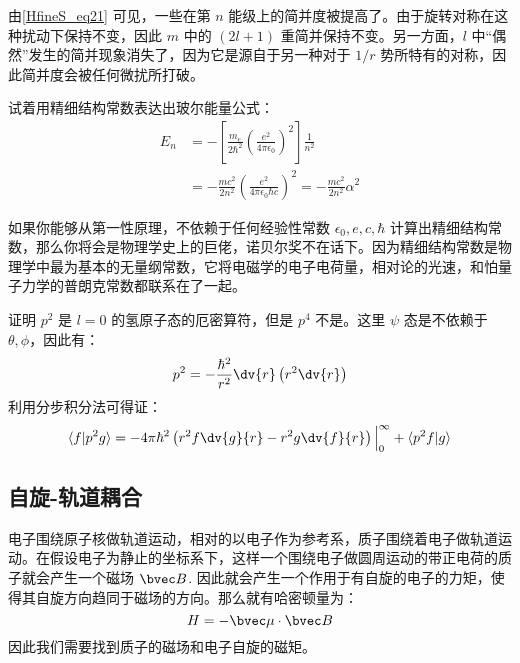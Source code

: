 由\autoref{HfineS_eq21} 可见，一些在第 $n$ 能级上的简并度被提高了。由于旋转对称在这种扰动下保持不变，因此 $m$ 中的 $(2l+1)$ 重简并保持不变。另一方面，$l$ 中“偶然”发生的简并现象消失了，因为它是源自于另一种对于 $1/r$ 势所特有的对称，因此简并度会被任何微扰所打破。
\begin{example}{}
试着用精细结构常数表达出玻尔能量公式：
\begin{align}
E_n&=-\left[\frac {m_e}{2\hbar^{2}} \left(\frac {e^ {2}}{4\pi \epsilon_0}\right)^ {2}\right]  \frac {1}{n^2}\\
&=-\frac{mc^2}{2n^2}\left(\frac {e^{2}}{4\pi \epsilon_0\hbar c}\right)^2=-\frac{mc^2}{2n^2}\alpha^2
\end{align}
\end{example}

如果你能够从第一性原理，不依赖于任何经验性常数 $\epsilon_0,e,c,\hbar$ 计算出精细结构常数，那么你将会是物理学史上的巨佬，诺贝尔奖不在话下。因为精细结构常数是物理学中最为基本的无量纲常数，它将电磁学的电子电荷量，相对论的光速，和怕量子力学的普朗克常数都联系在了一起。

\begin{example}{}
证明 $p^2$ 是 $l=0$ 的氢原子态的厄密算符，但是 $p^4$ 不是。这里 $\psi$ 态是不依赖于 $\theta,\phi$，因此有：
\begin{equation}
p^2=-\frac{\hbar^2}{r^2}\dv{r}\left(r^2\dv{r}\right)
\end{equation}
利用分步积分法可得证：
\begin{equation}
\langle f|p^2g\rangle = -4\pi\hbar^2\left(r^2f\dv{g}{r}-r^2g\dv{f}{r}\right)\Big|_0^\infty+\langle p^2f|g\rangle
\end{equation}

\end{example}
\subsection{自旋-轨道耦合}
电子围绕原子核做轨道运动，相对的以电子作为参考系，质子围绕着电子做轨道运动。在假设电子为静止的坐标系下，这样一个围绕电子做圆周运动的带正电荷的质子就会产生一个磁场 $\bvec B$. 因此就会产生一个作用于有自旋的电子的力矩，使得其自旋方向趋同于磁场的方向。那么就有哈密顿量为：
\begin{equation}\label{HfineS_eq26}
H=-\bvec\mu \cdot \bvec B
\end{equation}
因此我们需要找到质子的磁场和电子自旋的磁矩。

